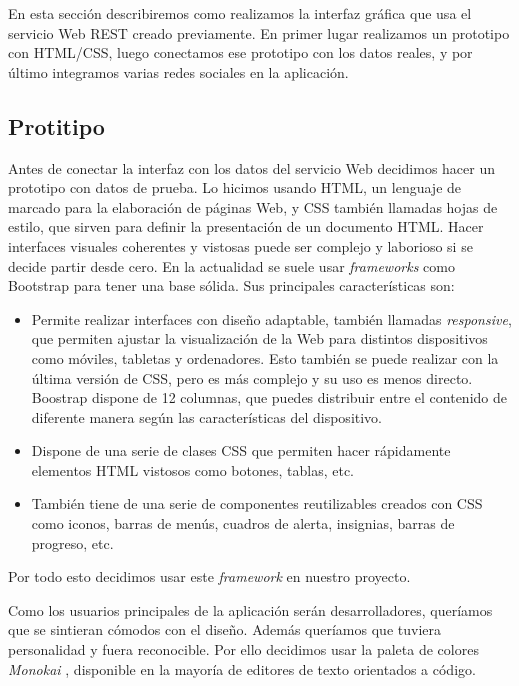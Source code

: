 
En esta sección describiremos como realizamos la interfaz gráfica que usa el servicio Web REST creado previamente. En primer lugar realizamos un prototipo con HTML/CSS, luego conectamos ese prototipo con los datos reales, y por último integramos varias redes sociales en la aplicación.

\subsection{Protitipo\label{subsec:interfaz}}
Antes de conectar la interfaz con los datos del servicio Web decidimos hacer un prototipo con datos de prueba. Lo hicimos usando HTML, un lenguaje de marcado para la elaboración de páginas Web, y CSS también llamadas hojas de estilo, que sirven para definir la presentación de un documento HTML. Hacer interfaces visuales coherentes y vistosas puede ser complejo y laborioso si se decide partir desde cero. En la actualidad se suele usar \emph{frameworks} como Bootstrap \cite{bootstrap} para tener una base sólida. Sus principales características son:

\begin{itemize}
\item
Permite realizar interfaces con diseño adaptable, también llamadas \emph{responsive}, que permiten ajustar la visualización de la Web para distintos dispositivos como móviles, tabletas y ordenadores. Esto también se puede realizar con la última versión de CSS, pero es más complejo y su uso es menos directo. Boostrap dispone de 12 columnas, que puedes distribuir entre el contenido de diferente manera según las características del dispositivo.

\item
Dispone de una serie de clases CSS que permiten hacer rápidamente elementos HTML vistosos como botones, tablas, etc.

\item
También tiene de una serie de componentes reutilizables creados con CSS como iconos, barras de menús, cuadros de alerta, insignias, barras de progreso, etc.
\end{itemize}

Por todo esto decidimos usar este \emph{framework} en nuestro proyecto.
 
\vspace{1em}
Como los usuarios principales de la aplicación serán desarrolladores, queríamos que se sintieran cómodos con el diseño. Además queríamos que tuviera personalidad y fuera reconocible. Por ello decidimos usar la paleta de colores \emph{Monokai} \cite{monokai}, disponible en la mayoría de editores de texto orientados a código.

